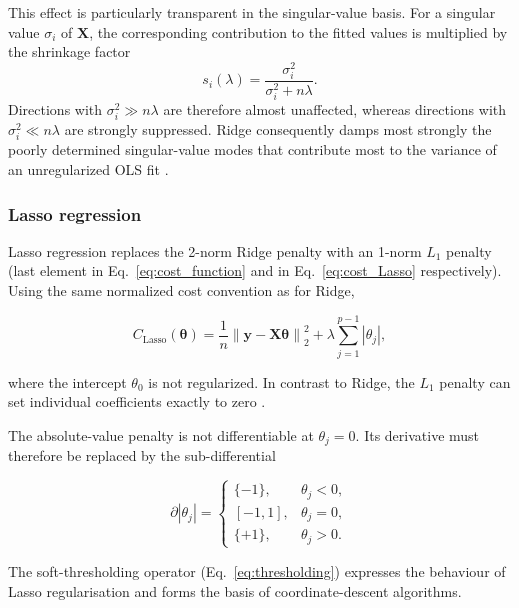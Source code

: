 \documentclass[aps,rmp,reprint,amsmath,amssymb,graphicx,longbibliography]{revtex4-1}
\begin{document}
This effect is particularly transparent in the singular-value basis. For a
singular value $\sigma_i$ of $\mathbf{X}$, the corresponding contribution to
the fitted values is multiplied by the shrinkage factor
\begin{equation}
    s_i(\lambda)
    =
    \frac{\sigma_i^2}
         {\sigma_i^2+n\lambda}.
\end{equation}
Directions with $\sigma_i^2\gg n\lambda$ are therefore almost unaffected,
whereas directions with $\sigma_i^2\ll n\lambda$ are strongly suppressed.
Ridge consequently damps most strongly the poorly determined singular-value
modes that contribute most to the variance of an unregularized OLS fit
\cite{HjorthJensen2026MLPS}.

\subsubsection*{Lasso regression}

Lasso regression replaces the 2-norm Ridge penalty with an 1-norm $L_1$ penalty (last element in Eq.~\eqref{eq:cost_function} and in Eq.~\eqref{eq:cost_Lasso} respectively).
Using the same normalized cost convention as for Ridge,

\begin{equation}
    C_{\mathrm{Lasso}}(\boldsymbol{\theta})
    =
    \frac{1}{n}
    \left\|
        \mathbf{y}-\mathbf{X}\boldsymbol{\theta}
    \right\|_2^2
    +
    \lambda
    \sum_{j=1}^{p-1}
    |\theta_j|,
    \label{eq:cost_Lasso}
\end{equation}

where the intercept $\theta_0$ is not regularized. In contrast to Ridge,
the $L_1$ penalty can set individual coefficients exactly to zero
\cite{HjorthJensen2026MLPS}.

The absolute-value penalty is not differentiable at $\theta_j=0$. Its
derivative must therefore be replaced by the sub-differential

\begin{equation}
    \partial |\theta_j|
    =
    \begin{cases}
        \{-1\}, & \theta_j < 0,\\
        [-1,1], & \theta_j = 0,\\
        \{+1\}, & \theta_j > 0.
    \end{cases}
\end{equation}

The soft-thresholding operator (Eq.~\eqref{eq:thresholding}) expresses the behaviour of Lasso regularisation and forms the basis of coordinate-descent algorithms.
\end{document}
